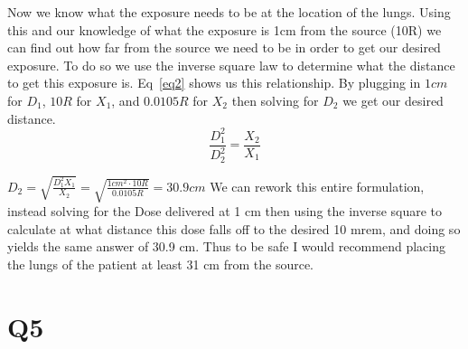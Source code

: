 \documentclass[12pt]{article}
\begin{document}
\noindent Now we know what the exposure needs to be at the location of the lungs. Using this and our knowledge of what the exposure is 1cm from the source (10R) we can find out how far from the source we need to be in order to get  our desired exposure. To do so we use the inverse square law to determine what the distance to get this exposure is. Eq~\ref{eq2} shows us this relationship. By plugging in $1cm$ for $D_1$, $10R$ for $X_1$, and $0.0105R$ for $X_2$ then solving for $D_2$ we get our desired distance.
\begin{equation}
\frac{D_1^2}{D_2^2} = \frac{X_2}{X_1}
\label{eq2}
\end{equation}


\noindent $D_2 = \sqrt{\frac{D_1^2X_1}{X_2}} = \sqrt{\frac{1cm^2\cdot 10R}{0.0105R}} = 30.9 cm$ We can rework this entire formulation, instead solving for the Dose delivered at 1 cm then using the inverse square to calculate at what distance this dose falls off to the desired 10 mrem, and doing so yields the same answer of 30.9 cm. Thus to be safe I would recommend placing the lungs of the patient at least 31 cm from the source. 
\section{Q5}
\end{document}
